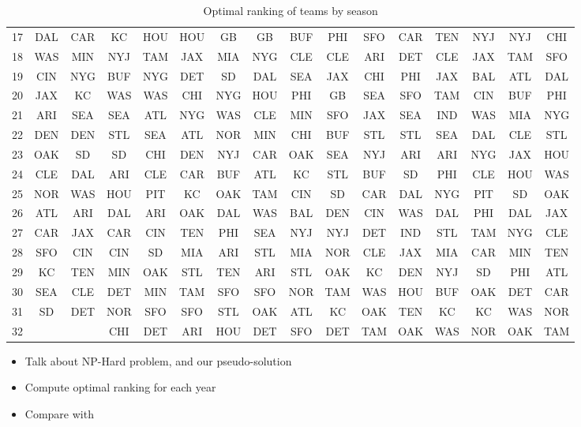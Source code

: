 \documentclass[11pt]{article}
\begin{document}
\begin{table}[!htb]
\begin{center}
\begin{tabular}{|c|c|c|c|c|c|c|c|c|c|c|c|c|c|c|c|}
17 & DAL & CAR & KC & HOU & HOU & GB & GB & BUF & PHI & SFO & CAR & TEN & NYJ & NYJ & CHI\\
18 & WAS & MIN & NYJ & TAM & JAX & MIA & NYG & CLE & CLE & ARI & DET & CLE & JAX & TAM & SFO\\
19 & CIN & NYG & BUF & NYG & DET & SD & DAL & SEA & JAX & CHI & PHI & JAX & BAL & ATL & DAL\\
20 & JAX & KC & WAS & WAS & CHI & NYG & HOU & PHI & GB & SEA & SFO & TAM & CIN & BUF & PHI\\
21 & ARI & SEA & SEA & ATL & NYG & WAS & CLE & MIN & SFO & JAX & SEA & IND & WAS & MIA & NYG\\
22 & DEN & DEN & STL & SEA & ATL & NOR & MIN & CHI & BUF & STL & STL & SEA & DAL & CLE & STL\\
23 & OAK & SD & SD & CHI & DEN & NYJ & CAR & OAK & SEA & NYJ & ARI & ARI & NYG & JAX & HOU\\
24 & CLE & DAL & ARI & CLE & CAR & BUF & ATL & KC & STL & BUF & SD & PHI & CLE & HOU & WAS\\
25 & NOR & WAS & HOU & PIT & KC & OAK & TAM & CIN & SD & CAR & DAL & NYG & PIT & SD & OAK\\
26 & ATL & ARI & DAL & ARI & OAK & DAL & WAS & BAL & DEN & CIN & WAS & DAL & PHI & DAL & JAX\\
27 & CAR & JAX & CAR & CIN & TEN & PHI & SEA & NYJ & NYJ & DET & IND & STL & TAM & NYG & CLE\\
28 & SFO & CIN & CIN & SD & MIA & ARI & STL & MIA & NOR & CLE & JAX & MIA & CAR & MIN & TEN\\
29 & KC & TEN & MIN & OAK & STL & TEN & ARI & STL & OAK & KC & DEN & NYJ & SD & PHI & ATL\\
30 & SEA & CLE & DET & MIN & TAM & SFO & SFO & NOR & TAM & WAS & HOU & BUF & OAK & DET & CAR\\
31 & SD & DET & NOR & SFO & SFO & STL & OAK & ATL & KC & OAK & TEN & KC & KC & WAS & NOR\\
32 & & & CHI & DET & ARI & HOU & DET & SFO & DET & TAM & OAK & WAS & NOR & OAK & TAM\\
\hline
\end{tabular}
\caption{Optimal ranking of teams by season}\label{table:optimal_ranking}
\end{center}
\end{table}


\begin{itemize}
\item Talk about NP-Hard problem, and our pseudo-solution
\item Compute optimal ranking for each year
\item Compare with \\%
\end{itemize}
\end{document}
